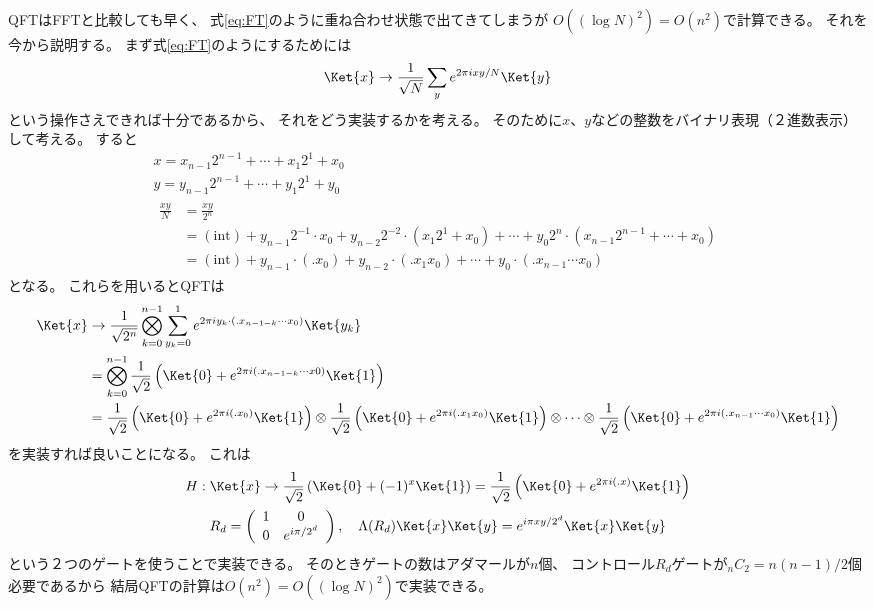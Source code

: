 \documentclass[a4paper, 10pt]{jsarticle}
\begin{document}
QFTはFFTと比較しても早く、
式\eqref{eq:FT}のように重ね合わせ状態で出てきてしまうが
$O ( (\log N)^2 ) = O(n^2)$で計算できる。
それを今から説明する。
まず式\eqref{eq:FT}のようにするためには
\begin{align}
	\Ket{x} \to \frac{1}{\sqrt{N}} \sum_y e^{2\pi i xy/N} \Ket{y}
\end{align}
という操作さえできれば十分であるから、
それをどう実装するかを考える。
そのために$x$、$y$などの整数をバイナリ表現（２進数表示）して考える。
すると
\begin{gather}
	x = x_{n-1} 2^{n-1} + \cdots + x_1 2^1 + x_0 \\
	y = y_{n-1} 2^{n-1} + \cdots + y_1 2^1 + y_0 \\
	\begin{aligned}
	\frac{xy}{N} &= \frac{xy}{2^n} \\
	&= (\mathrm{int}) + y_{n-1} 2^{-1} \cdot x_0
	+ y_{n-2} 2^{-2} \cdot \left( x_{1} 2^1 + x_0 \right)
	+ \cdots
	+ y_{0} 2^{n} \cdot \left( x_{n-1} 2^{n-1} + \cdots + x_0 \right) \\
	&= (\mathrm{int}) + y_{n-1} \cdot (.x_0)
	+ y_{n-2} \cdot (.x_1 x_0) + \cdots
	+ y_0 \cdot (.x_{n-1} \cdots x_0)
	\end{aligned}
\end{gather}
となる。
これらを用いるとQFTは
\begin{align}
	\Ket{x}
	&\to \frac{1}{\sqrt{2^n}} \bigotimes_{k=0}^{n-1}
	\sum_{y_k = 0}^1 e^{2 \pi i y_{k} \cdot (.x_{n-1-k} \cdots x_{0})}
	\Ket{y_k} \\
	&= \bigotimes_{k=0}^{n-1} \frac{1}{\sqrt{2}}
	\left( \Ket{0} + e^{2 \pi i (.x_{n-1-k} \cdots x{0})} \Ket{1} \right) \\
	&= \frac{1}{\sqrt{2}}
	\left( \Ket{0} + e^{2 \pi i (.x_0)} \Ket{1} \right)
	\otimes \frac{1}{\sqrt{2}}
	\left( \Ket{0} + e^{2 \pi i (.x_1 x_0)} \Ket{1} \right)
	\otimes \cdots
	\otimes \frac{1}{\sqrt{2}}
	\left( \Ket{0} + e^{2\pi i (.x_{n-1} \cdots x_0)} \Ket{1} \right)
\end{align}
を実装すれば良いことになる。
これは
\begin{gather}
	H : \Ket{x}
	\to \frac{1}{\sqrt{2}} \left( \Ket{0} + (-1)^{x} \Ket{1} \right)
	= \frac{1}{\sqrt{2}} \left( \Ket{0} + e^{2\pi i (.x)} \Ket{1} \right) \\
	R_d = \left( \begin{array}{cc}
		1 & 0 \\
		0 & e^{i \pi /2^d}
	\end{array} \right), \quad
	\Lambda (R_d) \Ket{x} \Ket{y}
	= e^{i \pi xy / 2^d} \Ket{x}\Ket{y}
\end{gather}
という２つのゲートを使うことで実装できる。
そのときゲートの数はアダマールが$n$個、
コントロール$R_d$ゲートが$_n C_2 = n(n-1)/2$個必要であるから
結局QFTの計算は$O (n^2) = O((\log N)^2)$で実装できる。
\end{document}
